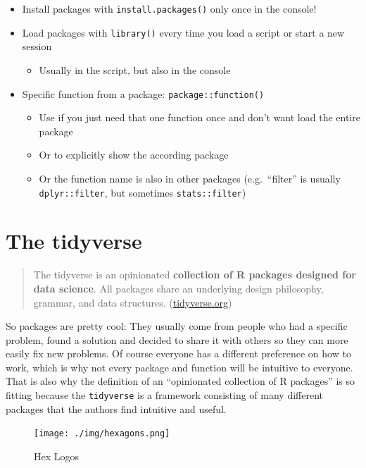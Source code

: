 \documentclass[
]{book}
\providecommand{\tightlist}{%
  \setlength{\itemsep}{0pt}\setlength{\parskip}{0pt}}
\begin{document}
\begin{itemize}
\tightlist
\item
  Install packages with \texttt{install.packages()} only once in the console!
\item
  Load packages with \texttt{library()} every time you load a script or start a new session

  \begin{itemize}
  \tightlist
  \item
    Usually in the script, but also in the console
  \end{itemize}
\item
  Specific function from a package: \texttt{package::function()}

  \begin{itemize}
  \tightlist
  \item
    Use if you just need that one function once and don't want load the entire package
  \item
    Or to explicitly show the according package
  \item
    Or the function name is also in other packages (e.g.~``filter'' is usually \texttt{dplyr::filter}, but sometimes \texttt{stats::filter})
  \end{itemize}
\end{itemize}

\section{The tidyverse}\label{the-tidyverse}

\begin{quote}
The tidyverse is an opinionated \textbf{collection of R packages designed for data science}. All packages share an underlying design philosophy, grammar, and data structures. (\url{tidyverse.org})
\end{quote}

So packages are pretty cool: They usually come from people who had a specific problem, found a solution and decided to share it with others so they can more easily fix new problems.
Of course everyone has a different preference on how to work, which is why not every package and function will be intuitive to everyone.
That is also why the definition of an ``opinionated collection of R packages'' is so fitting because the \texttt{tidyverse} is a framework consisting of many different packages that the authors find intuitive and useful.

\begin{figure}
\centering
\texttt{[image: ./img/hexagons.png]}
\caption{Hex Logos}
\end{figure}
\end{document}
